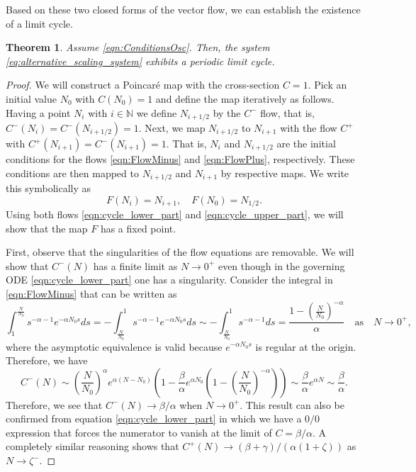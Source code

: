 \documentclass[12pt,a4paper]{article}
\newtheorem{theorem}{Theorem}
\begin{document}
Based on these two closed forms of the vector flow, we can establish the existence of a limit cycle. 
\begin{theorem}
Assume \eqref{eqn:ConditionsOsc}. Then, the system \eqref{eq:alternative_scaling_system} exhibits a periodic limit cycle. 
\end{theorem}
\begin{proof}
We will construct a Poincar\'e map with the cross-section $C=1$. Pick an initial value $N_0$ with $C(N_0) = 1$ and define the map iteratively as follows. Having a point $N_i$ with $i\in\mathbb{N}$ we define $N_{i+1/2}$ by the $C^-$ flow, that is, $C^-(N_i) = C^-(N_{i+1/2}) = 1$. Next, we map $N_{i+1/2}$ to $N_{i+1}$ with the flow $C^+$ with $C^+(N_{i+1}) = C^-(N_{i+1}) = 1$. That is, $N_i$ and $N_{i+1/2}$ are the initial conditions for the flows \eqref{eqn:FlowMinus} and \eqref{eqn:FlowPlus}, respectively. These conditions are then mapped to $N_{i+1/2}$ and $N_{i+1}$ by respective maps. We write this symbolically as
\begin{equation}
    F(N_i) = N_{i+1}, \quad F(N_0) = N_{1/2}.
\end{equation}
Using both flows \eqref{eqn:cycle_lower_part} and \eqref{eqn:cycle_upper_part}, we will show that the map $F$ has a fixed point. 

First, observe that the singularities of the flow equations are removable. We will show that $C^-(N)$ has a finite limit as $N\rightarrow 0^+$ even though in the governing ODE \eqref{eqn:cycle_lower_part} one has a singularity. Consider the integral in \eqref{eqn:FlowMinus} that can be written as
\begin{equation}
    \int_{1}^{\frac{N}{N_0}} s^{-\alpha - 1} e^{-\alpha N_0 s} ds = - \int_{\frac{N}{N_0}}^1 s^{-\alpha - 1} e^{-\alpha N_0 s} ds \sim - \int_{\frac{N}{N_0}}^1 s^{-\alpha - 1} ds = \frac{1-\left(\frac{N}{N_0}\right)^{-\alpha}}{\alpha} \quad \text{as} \quad N\rightarrow 0^+,
\end{equation}
where the asymptotic equivalence is valid because $e^{-\alpha N_0 s}$ is regular at the origin. Therefore, we have
\begin{equation}
    C^-(N) \sim \left( \frac{N}{N_0}\right)^{\alpha} e^{\alpha(N - N_0)}\left(1 - \frac{\beta}{\alpha} e^{\alpha N_0} \left(1-\left(\frac{N}{N_0}\right)^{-\alpha}\right)\right) \sim \frac{\beta}{\alpha} e^{\alpha N} \sim \frac{\beta}{\alpha}.
\end{equation}
Therefore, we see that $C^-(N) \rightarrow \beta/\alpha$ when $N\rightarrow 0^+$. This result can also be confirmed from equation \eqref{eqn:cycle_lower_part} in which we have a $0/0$ expression that forces the numerator to vanish at the limit of $C=\beta/\alpha$. A completely similar reasoning shows that $C^+(N) \rightarrow (\beta+\gamma)/(\alpha(1+\zeta))$ as $N\rightarrow \zeta^-$.


\end{proof}
\end{document}
